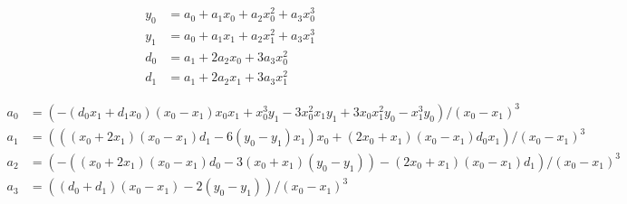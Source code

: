\begin{align}
  y_0 & = a_0+a_1 x_0+a_2 x_0^{2}+a_3 x_0^{3}  \\
   y_1 & = a_0+a_1 x_1+a_2 x_1^{2}+a_3 x_1^{3}  \\
   d_0 & =  a_1+2 a_2 x_0+3 a_3 x_0^{2}  \\
   d_1 & = a_1+2 a_2 x_1+3 a_3 x_1^{2}  
\end{align}

 
\begin{align}
  a_0 & =  \left(  -  \left( d_0 x_1+d_1 x_0 \right)   \left( x_0 - x_1 \right)  x_0 x_1+x_0^{3} y_1 - 3  x_0^{2} x_1 y_1+3 x_0 x_1^{2} y_0 - x_1^{3} y_0 \right)  /  \left( x_0 - x_1 \right) ^{3}  \\
   a_1  & =  \left(  \left(  \left( x_0+2 x_1 \right)   \left( x_0 - x_1 \right)  d_1 - 6  \left( y_0 - y_1  \right)  x_1 \right)  x_0+ \left( 2 x_0+x_1 \right)   \left( x_0 - x_1 \right)  d_0 x_1  \right)  /  \left( x_0 - x_1 \right) ^{3}  \\
   a_2 & =  \left(  -  \left(  \left( x_0+2 x_1 \right)    \left( x_0 - x_1 \right)  d_0 - 3  \left( x_0+x_1 \right)   \left( y_0 - y_1 \right)  \right)  -   \left( 2 x_0+x_1 \right)   \left( x_0 - x_1 \right)  d_1 \right)  /  \left( x_0 - x_1 \right) ^{3}   \\
   a_3 & =  \left(  \left( d_0+d_1 \right)   \left( x_0 - x_1 \right)  - 2  \left( y_0 - y_1 \right)   \right)  /  \left( x_0 - x_1 \right) ^{3}  
\end{align}
